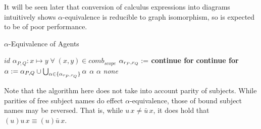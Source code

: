         It will be seen later that conversion of calculus expressions into diagrams intuitively shows $\alpha$-equivalence is reducible to graph isomorphism, so is expected to be of poor performance.
        \begin{breakablealgorithm}
            \caption{$\alpha$-Equivalence of Agents}
            \begin{algorithmic}[1]
                        \State\Return$id$
                    \EndIf
                        \State$\alpha_{P, Q} : x \mapsto y \; \forall \; (x, y) \in comb_{scope}$
                                \State$\alpha_{r_P, r_Q} :=$ 
                            \EndFor
                                \State\textbf{continue for}
                                \State\textbf{continue for}
                            \Else
                                \State$\alpha := \alpha_{P, Q} \cup \bigcup_{\alpha \in \{\alpha_{r_P, r_Q}\}} \alpha$
                            \EndIf
                                \State\Return$\alpha$
                            \EndIf
                        \EndFor
                            \State\Return$\alpha$
                        \EndIf
                    \EndFor
                    \State\Return\textit{none}
                \EndFunction
            \end{algorithmic}
        \end{breakablealgorithm}
        Note that the algorithm here does not take into account parity of subjects.
        While parities of free subject names do effect $\alpha$-equivalence, those of bound subject names may be reversed.
        That is, while $u \, x \neq \bar{u} \, x$, it does hold that $(u)u \, x \equiv (u)\bar{u} \, x$.


